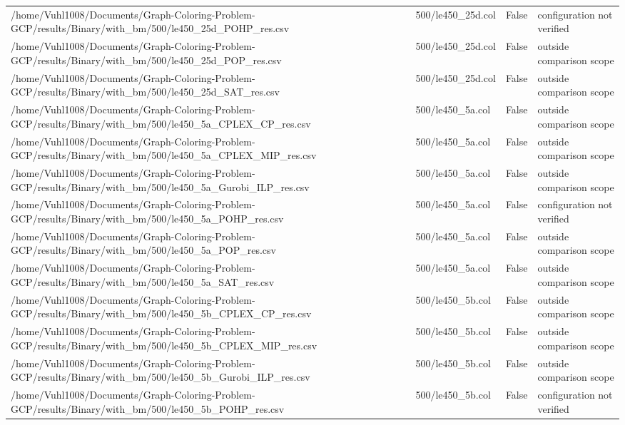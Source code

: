 \begin{table}[htbp]
\begin{tabular}{llll}
/home/Vuhl1008/Documents/Graph-Coloring-Problem-GCP/results/Binary/with\_bm/500/le450\_25d\_POHP\_res.csv & 500/le450\_25d.col & False & configuration not verified \\
/home/Vuhl1008/Documents/Graph-Coloring-Problem-GCP/results/Binary/with\_bm/500/le450\_25d\_POP\_res.csv & 500/le450\_25d.col & False & outside comparison scope \\
/home/Vuhl1008/Documents/Graph-Coloring-Problem-GCP/results/Binary/with\_bm/500/le450\_25d\_SAT\_res.csv & 500/le450\_25d.col & False & outside comparison scope \\
/home/Vuhl1008/Documents/Graph-Coloring-Problem-GCP/results/Binary/with\_bm/500/le450\_5a\_CPLEX\_CP\_res.csv & 500/le450\_5a.col & False & outside comparison scope \\
/home/Vuhl1008/Documents/Graph-Coloring-Problem-GCP/results/Binary/with\_bm/500/le450\_5a\_CPLEX\_MIP\_res.csv & 500/le450\_5a.col & False & outside comparison scope \\
/home/Vuhl1008/Documents/Graph-Coloring-Problem-GCP/results/Binary/with\_bm/500/le450\_5a\_Gurobi\_ILP\_res.csv & 500/le450\_5a.col & False & outside comparison scope \\
/home/Vuhl1008/Documents/Graph-Coloring-Problem-GCP/results/Binary/with\_bm/500/le450\_5a\_POHP\_res.csv & 500/le450\_5a.col & False & configuration not verified \\
/home/Vuhl1008/Documents/Graph-Coloring-Problem-GCP/results/Binary/with\_bm/500/le450\_5a\_POP\_res.csv & 500/le450\_5a.col & False & outside comparison scope \\
/home/Vuhl1008/Documents/Graph-Coloring-Problem-GCP/results/Binary/with\_bm/500/le450\_5a\_SAT\_res.csv & 500/le450\_5a.col & False & outside comparison scope \\
/home/Vuhl1008/Documents/Graph-Coloring-Problem-GCP/results/Binary/with\_bm/500/le450\_5b\_CPLEX\_CP\_res.csv & 500/le450\_5b.col & False & outside comparison scope \\
/home/Vuhl1008/Documents/Graph-Coloring-Problem-GCP/results/Binary/with\_bm/500/le450\_5b\_CPLEX\_MIP\_res.csv & 500/le450\_5b.col & False & outside comparison scope \\
/home/Vuhl1008/Documents/Graph-Coloring-Problem-GCP/results/Binary/with\_bm/500/le450\_5b\_Gurobi\_ILP\_res.csv & 500/le450\_5b.col & False & outside comparison scope \\
/home/Vuhl1008/Documents/Graph-Coloring-Problem-GCP/results/Binary/with\_bm/500/le450\_5b\_POHP\_res.csv & 500/le450\_5b.col & False & configuration not verified \\

\end{tabular}
\end{table}
